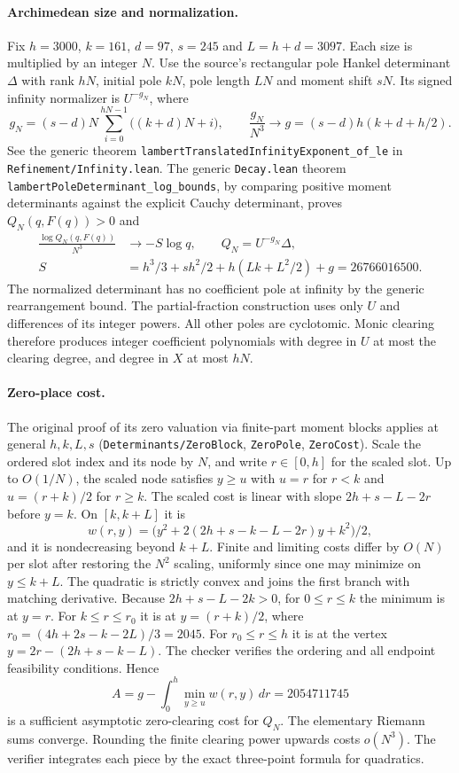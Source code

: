 \documentclass[11pt,a4paper]{article}
\begin{document}
\paragraph{Archimedean size and normalization.}
Fix $h=3000$, $k=161$, $d=97$, $s=245$ and $L=h+d=3097$. Each size is
multiplied by an integer $N$. Use the source's rectangular pole Hankel
determinant $\Delta$ with rank $hN$, initial pole $kN$, pole length $LN$ and
moment shift $sN$. Its signed infinity normalizer is $U^{-g_N}$, where
\[
 g_N=(s-d)N\sum_{i=0}^{hN-1}\bigl((k+d)N+i\bigr),\qquad
 \frac{g_N}{N^3}\longrightarrow g=(s-d)h(k+d+h/2).
\]
See the generic theorem
\texttt{lambert\allowbreak{}Translated\allowbreak{}Infinity\allowbreak{}Exponent\_\allowbreak{}of\_\allowbreak{}le} in
\texttt{Refinement/\allowbreak{}Infinity.lean}. The generic \texttt{Decay.lean} theorem
\texttt{lambert\allowbreak{}Pole\allowbreak{}Determinant\_\allowbreak{}log\_\allowbreak{}bounds}, by comparing positive moment
determinants against the explicit Cauchy determinant, proves
$Q_N(q,F(q))>0$ and
\[
 \begin{aligned}
 \frac{\log Q_N(q,F(q))}{N^3}&\longrightarrow -S\log q,\qquad
 Q_N=U^{-g_N}\Delta,\\
 S&=h^3/3+sh^2/2+h(Lk+L^2/2)+g=26766016500 .\end{aligned}
\]
The normalized determinant has no coefficient pole at infinity by the
generic rearrangement bound. The partial-fraction construction uses only
$U$ and differences of its integer powers. All other poles are cyclotomic.
Monic clearing therefore produces integer coefficient polynomials with
degree in $U$ at most the clearing degree, and degree in $X$ at most $hN$.

\paragraph{Zero-place cost.}
The original proof of its zero valuation via finite-part moment blocks
applies at general $h,k,L,s$ (\texttt{Determinants/\allowbreak{}Zero\allowbreak{}Block},
\texttt{ZeroPole}, \texttt{ZeroCost}). Scale the ordered slot index and its
node by $N$, and write $r\in[0,h]$ for the scaled slot. Up to $O(1/N)$, the
scaled node satisfies $y\ge u$ with $u=r$ for $r<k$ and $u=(r+k)/2$ for
$r\ge k$. The scaled cost is linear with slope $2h+s-L-2r$ before $y=k$.
On $[k,k+L]$ it is
\[
 w(r,y)=\bigl(y^2+2(2h+s-k-L-2r)y+k^2\bigr)/2,
\]
and it is nondecreasing beyond $k+L$. Finite and limiting costs differ by
$O(N)$ per slot after restoring the $N^2$ scaling, uniformly since one may
minimize on $y\le k+L$. The quadratic is strictly convex and joins the
first branch with matching derivative. Because $2h+s-L-2k>0$, for
$0\le r\le k$ the minimum is at $y=r$. For $k\le r\le r_0$ it is at
$y=(r+k)/2$, where $r_0=(4h+2s-k-2L)/3=2045$. For $r_0\le r\le h$ it is at
the vertex $y=2r-(2h+s-k-L)$. The checker verifies the ordering and all
endpoint feasibility conditions. Hence
\[
 A=g-\int_0^h\min_{y\ge u} w(r,y)\,dr=2054711745
\]
is a sufficient asymptotic zero-clearing cost for $Q_N$. The elementary
Riemann sums converge. Rounding the finite clearing power upwards costs
$o(N^3)$. The verifier integrates each piece by the exact three-point formula
for quadratics.
\end{document}
